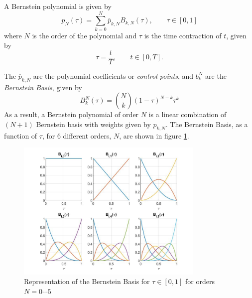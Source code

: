 \par A Bernstein polynomial is given by %
\begin{equation}
    \label{eq:bern_pol}
    p_N(\tau) = \sum_{k=0}^N \overline{p}_{k,N} B_{k,N} (\tau), \qquad \tau\in [0,1]
\end{equation}
where $N$ is the order of the polynomial and $\tau$ is the time contraction of $t$, given by 
\begin{equation}
    \tau = \frac{t}{T}, \qquad t\in [0,T].
    \label{eq:time_delay}
\end{equation}
\par The $\overline{p}_{k,N}$ are the polynomial coefficients or \textit{control points}, and $b_k^N$ are the \textit{Bernstein Basis}, given by 
\begin{equation}
	B^N_k {(\tau)} = \binom{N}{k} {(1 - \tau)}^{N-k} \tau^k
    \label{eq:bern_basis}
\end{equation}
As a result, a Bernstein polynomial of order $N$ is a linear combination of $(N+1)$ Bernstein basis with weights given by $p_{k,N}$. The Bernstein Basis, as a function of $\tau$, for 6 different orders, $N$, are shown in figure \ref{fig:bernsteinbasis}.

\begin{figure}[h!]
\centering
\includegraphics[width=0.8\textwidth]{Images/bernstein_basis.jpg}
\caption{Representation of the Bernstein Basis for $\tau \in [0,1]$ for orders $N=0\cdots 5$}
\label{fig:bernsteinbasis}
\end{figure}

